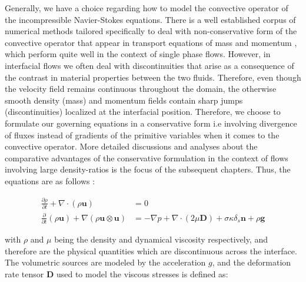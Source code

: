 Generally, we have a choice regarding how to model the convective operator
of the incompressible Navier-Stokes equations. There is a well established corpus of 
numerical methods tailored specifically to deal with non-conservative 
 form of the convective 
operator that appear in transport equations of mass and momentum 
, which perform quite well in the context of single phase flows.
However, in interfacial flows we often deal with discontinuities that arise as a consequence
of the contrast in material properties between the two fluids. Therefore, even though the velocity field
remains continuous throughout the domain, the otherwise smooth density (mass) and momentum fields 
contain sharp jumps (discontinuities) localized at the interfacial position.     
Therefore, we choose to formulate our governing equations in a conservative form i.e involving divergence of fluxes instead of gradients of the primitive variables when it comes to the convective operator. More detailed discussions and analyses about the comparative advantages of the conservative formulation in the context of flows involving large density-ratios is the focus of the subsequent chapters. Thus, the equations are as follows :  




\begin{align} 
	\frac{\partial \rho}{\partial t} + \nabla\cdot \left(\rho\boldsymbol{u}\right) &= 0 \label{mass} \\
	\frac{\partial}{\partial t} \left(\rho\boldsymbol{u}\right) + \nabla\left(\rho\boldsymbol{u}\otimes\boldsymbol{u}\right)  &= -\nabla p + \nabla \cdot \left(2 \mu \boldsymbol{D}\right) + \sigma \kappa \delta_{s}\boldsymbol{n} + \rho \boldsymbol{g}
\label{nseqn}
\end{align}


with $\rho$ and $\mu$ being the density and dynamical viscosity respectively, and therefore are the physical quantities which are discontinuous across the interface. The volumetric sources are modeled by the acceleration $g$, and the deformation rate tensor $\boldsymbol{D}$ used to model the viscous stresses is defined as:  

